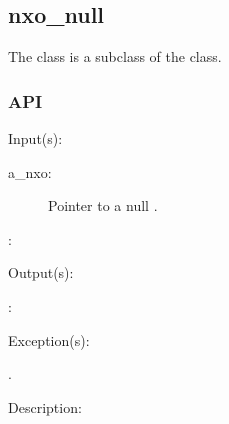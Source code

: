 %
%
%
%
%              

\subsection{nxo\_null}
\label{nxo_null}

The  class is a subclass of the  class.

\subsubsection{API}
\begin{capi}
\label{nxo_null_}
	\begin{capilist}
	\item[Input(s): ]
		\begin{description}\item[]
		\item[a\_nxo: ]
			Pointer to a null .
		\item[: ]
		\end{description}
	\item[Output(s): ]
		\begin{description}\item[]
		\item[: ]
		\end{description}
	\item[Exception(s): ]
		\begin{description}\item[]
		\item[.]
		\end{description}
	\item[Description: ]
	\end{capilist}
\end{capi}
